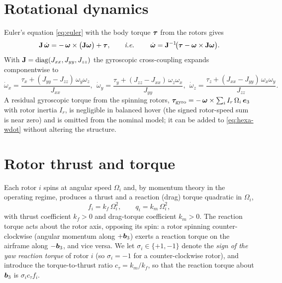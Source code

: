 \section{Rotational dynamics}

Euler's equation \cref{eq:euler} with the body torque $\bm{\tau}$ from the rotors
gives
\begin{equation}
\mathbf{J}\,\dot{\bm{\omega}} = -\,\bm{\omega}\times\bigl(\mathbf{J}\bm{\omega}\bigr)
+\bm{\tau},
\qquad\text{\textit{i.e.}\ }\qquad
\dot{\bm{\omega}} = \mathbf{J}^{-1}\!\bigl(\bm{\tau}-\bm{\omega}\times\mathbf{J}\bm{\omega}\bigr).
\label{eq:hexa-wdot}
\end{equation}
With $\mathbf{J}=\operatorname{diag}(J_{xx},J_{yy},J_{zz})$ the gyroscopic cross-coupling expands
componentwise to
\begin{equation}
\dot{\omega}_x=\frac{\tau_x+(J_{yy}-J_{zz})\,\omega_y\omega_z}{J_{xx}},\ \
\dot{\omega}_y=\frac{\tau_y+(J_{zz}-J_{xx})\,\omega_z\omega_x}{J_{yy}},\ \
\dot{\omega}_z=\frac{\tau_z+(J_{xx}-J_{yy})\,\omega_x\omega_y}{J_{zz}}.
\label{eq:hexa-wdot-comp}
\end{equation}
A residual gyroscopic torque from the spinning rotors,
$\bm{\tau}_{\text{gyro}}=-\,\bm{\omega}\times\sum_i I_r\,\Omega_i\,\bm{e}_3$ with
rotor inertia $I_r$, is negligible in balanced hover (the signed rotor-speed sum
is near zero) and is omitted from the nominal model; it can be added to
\cref{eq:hexa-wdot} without altering the structure.

\section{Rotor thrust and torque}
\label{sec:hexa-rotor}

Each rotor $i$ spins at angular speed $\Omega_i$ and, by momentum theory in the
operating regime, produces a thrust and a reaction (drag) torque quadratic in
$\Omega_i$,
\begin{equation}
f_i = k_f\,\Omega_i^2, \qquad q_i = k_m\,\Omega_i^2,
\label{eq:rotor-ft}
\end{equation}
with thrust coefficient $k_f>0$ and drag-torque coefficient $k_m>0$. The reaction
torque acts about the rotor axis, opposing its spin: a rotor spinning counter-%
clockwise (angular momentum along $+\bm{b}_3$) exerts a reaction torque on the
airframe along $-\bm{b}_3$, and vice versa. We let $\sigma_i\in\{+1,-1\}$ denote
the \emph{sign of the yaw reaction torque} of rotor $i$ (so $\sigma_i=-1$ for a
counter-clockwise rotor), and introduce the torque-to-thrust ratio
$c_\tau=k_m/k_f$, so that the reaction torque about $\bm{b}_3$ is
$\sigma_i c_\tau f_i$.

